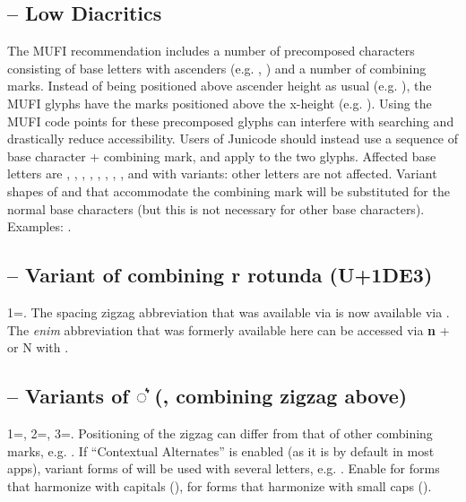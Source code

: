 \subsection{ – Low Diacritics}
The MUFI recommendation includes a number of precomposed characters consisting of
base letters with ascenders (e.g. , ) and a number of combining marks.
Instead of being positioned above ascender height as usual (e.g.
), the MUFI glyphs have the marks positioned above the x-height
(e.g. ).
Using the MUFI code points for these precomposed glyphs can interfere with searching
and drastically reduce accessibility. Users of Junicode should instead use a sequence of base character + combining
mark, and apply  to the two glyphs. Affected base letters are
, , , , , , , ,
and  with variants: other letters are not affected.
Variant shapes of  and \textex{{\dh}}
that accommodate the combining mark will be substituted for the normal base characters (but this is not necessary for
other base characters). Examples:
.

\subsection{ – Variant of combining r rotunda (U+1DE3)}
1=. The spacing zigzag abbreviation that was available via  is now available 
via . The \textit{enim} abbreviation that was formerly available here can be accessed via 
\textbf{n} +  or N with .

\subsection{ – Variants of ◌͛ (, combining
zigzag above)}
1=, 2=, 3=. Positioning of the zigzag can differ from that of other combining
marks, e.g. . If  “Contextual Alternates” is enabled (as it is by
default in most apps), variant forms of  will be used with several letters, e.g.
. Enable  for forms that harmonize with capitals
(),
 for forms that harmonize with small caps
().

